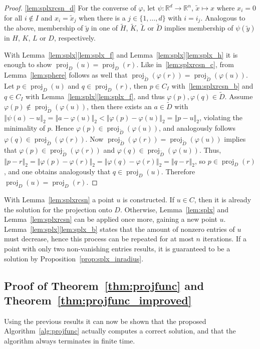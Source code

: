 \documentclass[twoside,11pt]{article}
\DeclareMathOperator{\proj}{proj}
\newcommand{\R}{\mathbb{R}}
\newcommand{\0}{\mathcal{O}}
\newcommand{\norm}[1]{\left\Vert#1\right\Vert}
\newcommand{\discint}[2]{\{#1,\dotsc,#2\}}
\newcommand{\inint}[2]{\in\discint{#1}{#2}}
\begin{document}
\begin{proof}
\ref{lem:splxrcsn_d}
For the converse of $\varphi$, let $\psi\colon\R^d\to\R^n$, $\tilde{x}\mapsto x$ where $x_i = 0$ for all $i\not\in I$ and $x_i = \tilde{x}_j$ when there is a $j\inint{1}{d}$ with $i = i_j$.
Analogous to the above, membership of $\tilde{y}$ in one of $\tilde{H}$, $\tilde{K}$, $\tilde{L}$ or $\tilde{D}$ implies membership of $\psi(\tilde{y})$ in $H$, $K$, $L$ or $D$, respectively.

With Lemma~\ref{lem:splx}\ref{lem:splx_f} and Lemma~\ref{lem:splx}\ref{lem:splx_h} it is enough to show $\proj_D(u) = \proj_D(r)$.
Like in~\ref{lem:splxrcsn_c}, from Lemma~\ref{lem:sphere} follows as well that $\proj_{\tilde{D}}(\varphi(r)) = \proj_{\tilde{D}}(\varphi(u))$.
Let $p\in\proj_D(u)$ and $q\in\proj_D(r)$, then $p\in C_I$ with~\ref{lem:splxrcsn_b} and $q\in C_I$ with Lemma~\ref{lem:splx}\ref{lem:splx_f}, and thus $\varphi(p),\varphi(q)\in\tilde{D}$.
Assume $\varphi(p)\not\in\proj_{\tilde{D}}(\varphi(u))$, then there exists an $a\in\tilde{D}$ with $\norm{\psi(a) - u}_2 = \norm{a - \varphi(u)}_2 < \norm{\varphi(p) - \varphi(u)}_2 = \norm{p - u}_2$, violating the minimality of $p$.
Hence $\varphi(p)\in\proj_{\tilde{D}}(\varphi(u))$, and analogously follows $\varphi(q)\in\proj_{\tilde{D}}(\varphi(r))$.
Now $\proj_{\tilde{D}}(\varphi(r)) = \proj_{\tilde{D}}(\varphi(u))$ implies that $\varphi(p)\in\proj_{\tilde{D}}(\varphi(r))$ and $\varphi(q)\in\proj_{\tilde{D}}(\varphi(u))$.
Thus, $\norm{p - r}_2 = \norm{\varphi(p) - \varphi(r)}_2 = \norm{\varphi(q) - \varphi(r)}_2 = \norm{q - r}_2$, so $p\in\proj_D(r)$, and one obtains analogously that $q\in\proj_D(u)$.
Therefore $\proj_D(u) = \proj_D(r)$.
\end{proof}
With Lemma~\ref{lem:splxrcsn} a point $u$ is constructed.
If $u\in C$, then it is already the solution for the projection onto $D$.
Otherwise, Lemma~\ref{lem:splx} and Lemma~\ref{lem:splxrcsn} can be applied once more, gaining a new point $u$.
Lemma~\ref{lem:splx}\ref{lem:splx_b} states that the amount of nonzero entries of $u$ must decrease, hence this process can be repeated for at most $n$ iterations.
If a point with only two non-vanishing entries results, it is guaranteed to be a solution by Proposition~\ref{prop:splx_inradius}.

\subsection{Proof of Theorem~\ref{thm:projfunc} and Theorem~\ref{thm:projfunc_improved}}
\label{sect:proof_projfunc_thms}
Using the previous results it can now be shown that the proposed Algorithm~\ref{alg:projfunc} actually computes a correct solution, and that the algorithm always terminates in finite time.
\end{document}
